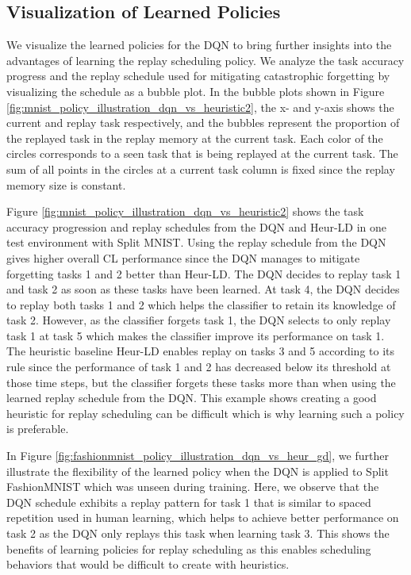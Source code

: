 \subsection{Visualization of Learned Policies}
\label{paperD:sec:visualization_of_learned_policies}

We visualize the learned policies for the DQN to bring further insights into the advantages of learning the replay scheduling policy. We analyze the task accuracy progress and the replay schedule used for mitigating catastrophic forgetting by visualizing the schedule as a bubble plot. In the bubble plots shown in Figure \ref{fig:mnist_policy_illustration_dqn_vs_heuristic2}, the x- and y-axis shows the current and replay task respectively, and the bubbles represent the proportion of the replayed task in the replay memory at the current task. Each color of the circles corresponds to a seen task that is being replayed at the current task. The sum of all points in the circles at a current task column is fixed since the replay memory size is constant. 



Figure \ref{fig:mnist_policy_illustration_dqn_vs_heuristic2} shows the task accuracy progression and replay schedules from the DQN and Heur-LD in one test environment with Split MNIST. Using the replay schedule from the DQN gives higher overall CL performance since the DQN manages to mitigate forgetting tasks 1 and 2 better than Heur-LD. The DQN decides to replay task 1 and task 2 as soon as these tasks have been learned. At task 4, the DQN decides to replay both tasks 1 and 2 which helps the classifier to retain its knowledge of task 2. However, as the classifier forgets task 1, the DQN selects to only replay task 1 at task 5 which makes the classifier improve its performance on task 1. 
The heuristic baseline Heur-LD enables replay on tasks 3 and 5 according to its rule since the performance of task 1 and 2 has decreased below its threshold at those time steps, but the classifier forgets these tasks more than when using the learned replay schedule from the DQN. This example shows creating a good heuristic for replay scheduling can be difficult which is why learning such a policy is preferable. 

In Figure \ref{fig:fashionmnist_policy_illustration_dqn_vs_heur_gd}, we further illustrate the flexibility of the learned policy when the DQN is applied to Split FashionMNIST which was unseen during training. Here, we observe that the DQN schedule exhibits a replay pattern for task 1 that is similar to spaced repetition used in human learning, which helps to achieve better performance on task 2 as the DQN only replays this task when learning task 3. This shows the benefits of learning policies for replay scheduling as this enables scheduling behaviors that would be difficult to create with heuristics.   

